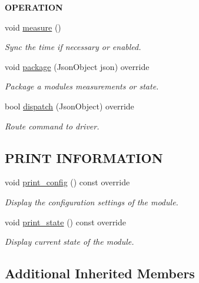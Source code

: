 \begin{Indent}{\bf O\+P\+E\+R\+A\+T\+I\+ON}\par
\begin{DoxyCompactItemize}
\item 
void \hyperlink{class_loom_n_t_p_sync_a59671fae8c01482a2643cadaef3fd73d}{measure} ()
\begin{DoxyCompactList}\small\item\em Sync the time if necessary or enabled. \end{DoxyCompactList}\item 
void \hyperlink{class_loom_n_t_p_sync_a99820eea8c86bbeb299a12fa2164fdad}{package} (Json\+Object json) override
\begin{DoxyCompactList}\small\item\em Package a modules measurements or state. \end{DoxyCompactList}\item 
bool \hyperlink{class_loom_n_t_p_sync_aab638db55b31b1233fe697117d3e3330}{dispatch} (Json\+Object) override
\begin{DoxyCompactList}\small\item\em Route command to driver. \end{DoxyCompactList}\end{DoxyCompactItemize}
\end{Indent}
\subsection*{P\+R\+I\+NT I\+N\+F\+O\+R\+M\+A\+T\+I\+ON}
\begin{DoxyCompactItemize}
\item 
void \hyperlink{class_loom_n_t_p_sync_af683546f2b20799e3afbcf61eaabfc2b}{print\+\_\+config} () const override
\begin{DoxyCompactList}\small\item\em Display the configuration settings of the module. \end{DoxyCompactList}\item 
void \hyperlink{class_loom_n_t_p_sync_ad33806de76e81d80f9868951e83a8191}{print\+\_\+state} () const override
\begin{DoxyCompactList}\small\item\em Display current state of the module. \end{DoxyCompactList}\end{DoxyCompactItemize}
\subsection*{Additional Inherited Members}


